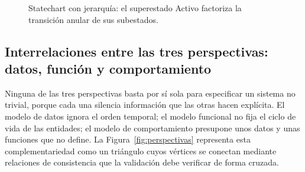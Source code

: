 \documentclass[11pt,a4paper,oneside]{report}
\begin{document}
	\begin{figure}[htbp]
		\centering
		\caption{Statechart con jerarqu\'ia: el superestado \textsf{Activo} factoriza la transici\'on \textsf{anular} de sus subestados.}
		\label{fig:statechart}
	\end{figure}
	
	\subsection{Interrelaciones entre las tres perspectivas: datos, funci\'on y comportamiento}
	
	Ninguna de las tres perspectivas basta por s\'i sola para especificar un sistema no trivial, porque cada una silencia informaci\'on que las otras hacen expl\'icita. El modelo de datos ignora el orden temporal; el modelo funcional no fija el ciclo de vida de las entidades; el modelo de comportamiento presupone unos datos y unas funciones que no define. La Figura~\ref{fig:perspectivas} representa esta complementariedad como un tri\'angulo cuyos v\'ertices se conectan mediante relaciones de consistencia que la validaci\'on debe verificar de forma cruzada.
	
\end{document}
